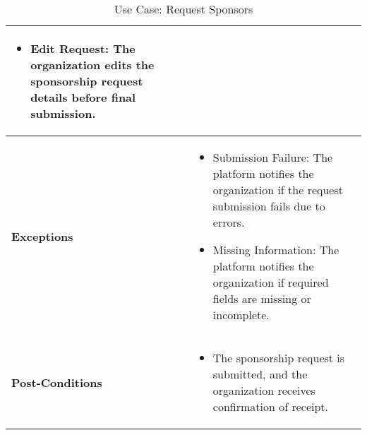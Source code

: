\begin{table}[!ht]
\begin{tabularx}{\textwidth}{|l|X|}
\begin{itemize}[label=--,itemsep=0pt]
            \item Edit Request: The organization edits the sponsorship request details before final submission.
        \end{itemize} \\
        \hline
        \textbf{Exceptions} & 
        \begin{itemize}[label=--,itemsep=0pt]
            \item Submission Failure: The platform notifies the organization if the request submission fails due to errors.
            \item Missing Information: The platform notifies the organization if required fields are missing or incomplete.
        \end{itemize} \\
        \hline
        \textbf{Post-Conditions} & 
        \begin{itemize}[label=--,itemsep=0pt]
            \item The sponsorship request is submitted, and the organization receives confirmation of receipt.
        \end{itemize} \\
        \hline
    \end{tabularx}
    \caption{Use Case: Request Sponsors}
    \label{tab:use-case-request-sponsors}
\end{table}


\clearpage